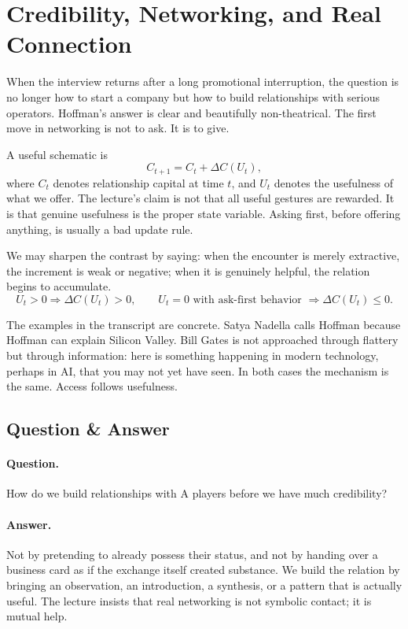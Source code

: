 \section{Credibility, Networking, and Real Connection}

When the interview returns after a long promotional interruption, the question is no longer how to start a company but how to build relationships with serious operators. Hoffman's answer is clear and beautifully non-theatrical. The first move in networking is not to ask. It is to give.

A useful schematic is
\begin{equation}
C_{t+1}=C_t+\Delta C(U_t),
\end{equation}
where \(C_t\) denotes relationship capital at time \(t\), and \(U_t\) denotes the usefulness of what we offer. The lecture's claim is not that all useful gestures are rewarded. It is that genuine usefulness is the proper state variable. Asking first, before offering anything, is usually a bad update rule.

We may sharpen the contrast by saying: when the encounter is merely extractive, the increment is weak or negative; when it is genuinely helpful, the relation begins to accumulate.
\begin{equation}
U_t>0 \Longrightarrow \Delta C(U_t)>0,
\qquad
U_t=0 \text{ with ask-first behavior } \Longrightarrow \Delta C(U_t)\leq 0.
\end{equation}

The examples in the transcript are concrete. Satya Nadella calls Hoffman because Hoffman can explain Silicon Valley. Bill Gates is not approached through flattery but through information: here is something happening in modern technology, perhaps in AI, that you may not yet have seen. In both cases the mechanism is the same. Access follows usefulness.

\subsection{Question \& Answer}

\paragraph{Question.}
How do we build relationships with A players before we have much credibility?

\paragraph{Answer.}
Not by pretending to already possess their status, and not by handing over a business card as if the exchange itself created substance. We build the relation by bringing an observation, an introduction, a synthesis, or a pattern that is actually useful. The lecture insists that real networking is not symbolic contact; it is mutual help.

